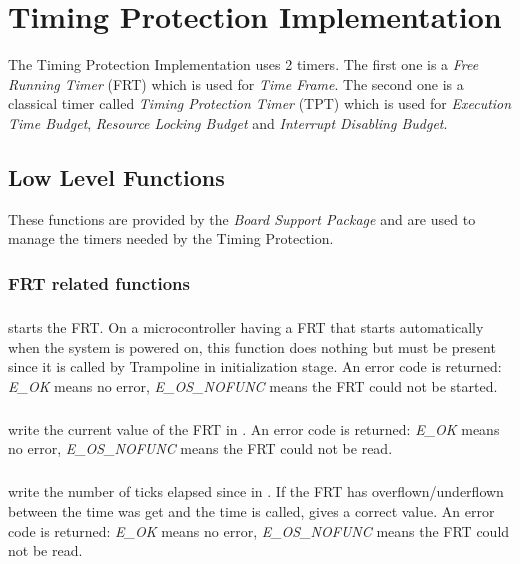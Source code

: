 
\chapter{Timing Protection Implementation}

The Timing Protection Implementation uses 2 timers. The first one is a {\em Free Running Timer} (FRT) which is used for {\em Time Frame}. The second one is a classical timer called {\em Timing Protection Timer} (TPT) which is used for \emph{Execution Time Budget}, \emph{Resource Locking Budget} and \emph{Interrupt Disabling Budget}.

\section{Low Level Functions}

These functions are provided by the {\em Board Support Package} and are used to manage the timers needed by the Timing Protection.

\subsection{FRT related functions}

\paragraph{} starts the FRT. On a microcontroller having a FRT that starts automatically when the system is powered on, this function does nothing but must be present since it is called by Trampoline in initialization stage. An error code is returned: {\em E\_OK} means no error, {\em E\_OS\_NOFUNC} means the FRT could not be started.

\paragraph{} write the current value of the FRT in . An error code is returned: {\em E\_OK} means no error, {\em E\_OS\_NOFUNC} means the FRT could not be read.

\paragraph{} write the number of ticks elapsed since  in . If the FRT has overflown/underflown between the time  was get and the time  is called,  gives a correct value. An error code is returned: {\em E\_OK} means no error, {\em E\_OS\_NOFUNC} means the FRT could not be read.

